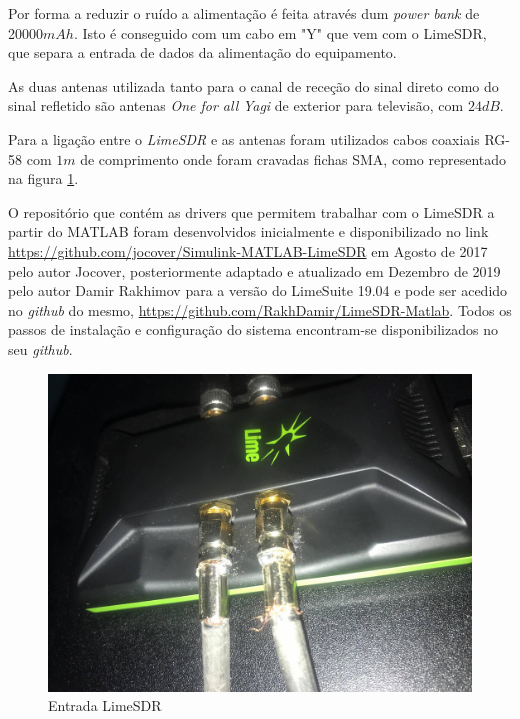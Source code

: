 Por forma a reduzir o ruído a alimentação é feita através dum \textit{power bank} de 20000$mAh$. Isto é conseguido com um cabo em "Y" que vem com o LimeSDR, que separa a entrada de dados da alimentação do equipamento.\par 
As duas antenas utilizada tanto para o canal de receção do sinal direto como do sinal refletido são antenas \textit{One for all} \textit{Yagi} de exterior para televisão, com $24dB$.\par 
Para a ligação entre o \textit{LimeSDR} e as antenas foram utilizados cabos coaxiais RG-58 com $1m$ de comprimento onde foram cravadas fichas SMA, como representado na figura \ref{fig:limec}.\par 
O repositório que contém as drivers que permitem trabalhar com o LimeSDR a partir do MATLAB foram desenvolvidos inicialmente e disponibilizado no link \url{https://github.com/jocover/Simulink-MATLAB-LimeSDR} em Agosto de 2017 pelo autor Jocover, posteriormente adaptado e atualizado em Dezembro de 2019 pelo autor Damir Rakhimov para a versão do LimeSuite 19.04 e pode ser acedido no \textit{github} do mesmo, \url{https://github.com/RakhDamir/LimeSDR-Matlab}. Todos os passos de instalação e configuração do sistema encontram-se disponibilizados no seu \textit{github}.

\begin{figure}[h]
\centering
\includegraphics[scale=0.15]{chapters/ch5/assets/limec}
\caption[Entrada LimeSDR]{Entrada LimeSDR}
\label{fig:limec}
\end{figure}

